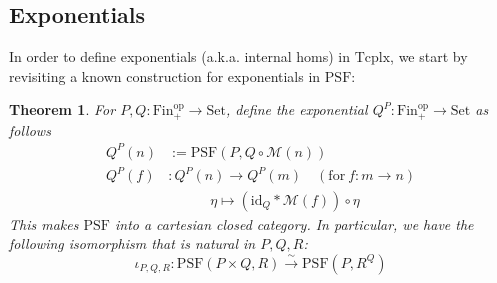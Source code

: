 \documentclass{article}
\newtheorem{theorem}{Theorem}[subsection]
\theoremstyle{remark}
\theoremstyle{definition}
\newcommand{\Fin}{\mathrm{Fin}}
\newcommand{\Set}{\mathrm{Set}}
\newcommand{\PSF}{\mathrm{PSF}}
\newcommand{\op}{\mathrm{op}}
\newcommand{\id}{\mathrm{id}}
\newcommand{\Tcplx}{\mathrm{Tcplx}}
\newcommand{\M}{\mathcal M}
\begin{document}
	\subsection{Exponentials}
	In order to define exponentials (a.k.a. internal homs) in $\Tcplx$, we start by revisiting a known construction for exponentials in $\PSF$:
	\begin{theorem}
		For $P,Q:\Fin_+^\op\to\Set$, define the exponential $Q^P:\Fin_+^\op\to\Set$ as follows
		\begin{align*}
			Q^P(n)&:=\PSF(P,Q\circ\M(n))\\
			Q^P(f)&:Q^P(n)\to Q^P(m)\quad(\mathrm{for }\ f:m\to n)\\
			&\quad\qquad\eta\mapsto(\id_Q*\M(f))\circ\eta
		\end{align*}
		This makes $\PSF$ into a cartesian closed category. In particular, we have the following isomorphism that is natural in $P,Q,R$:
		\[\iota_{P,Q,R}:\PSF(P\times Q, R)\xrightarrow{\sim}\PSF(P,R^Q)\]
	\end{theorem}
\end{document}
